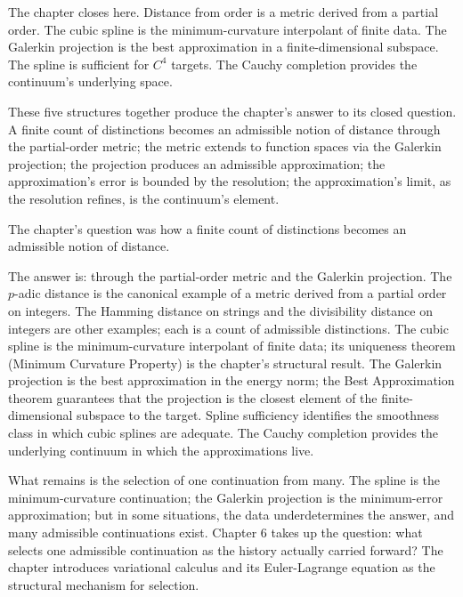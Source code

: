 The chapter closes here. Distance from order is a metric derived
from a partial order. The cubic spline is the minimum-curvature
interpolant of finite data. The Galerkin projection is the best
approximation in a finite-dimensional subspace. The spline is
sufficient for $C^4$ targets. The Cauchy completion provides the
continuum's underlying space.

These five structures together produce the chapter's answer to its
closed question. A finite count of distinctions becomes an
admissible notion of distance through the partial-order metric;
the metric extends to function spaces via the Galerkin projection;
the projection produces an admissible approximation; the
approximation's error is bounded by the resolution; the
approximation's limit, as the resolution refines, is the
continuum's element.

\begin{bridge}

The chapter's question was how a finite count of distinctions
becomes an admissible notion of distance.

The answer is: through the partial-order metric and the Galerkin
projection. The $p$-adic distance is the canonical example of a
metric derived from a partial order on integers. The Hamming
distance on strings and the divisibility distance on integers are
other examples; each is a count of admissible distinctions. The
cubic spline is the minimum-curvature interpolant of finite data;
its uniqueness theorem (Minimum Curvature Property) is the
chapter's structural result. The Galerkin projection is the best
approximation in the energy norm; the Best Approximation theorem
guarantees that the projection is the closest element of the
finite-dimensional subspace to the target. Spline sufficiency
identifies the smoothness class in which cubic splines are
adequate. The Cauchy completion provides the underlying continuum
in which the approximations live.

What remains is the selection of one continuation from many. The
spline is the minimum-curvature continuation; the Galerkin
projection is the minimum-error approximation; but in some
situations, the data underdetermines the answer, and many
admissible continuations exist. Chapter 6 takes up the question:
what selects one admissible continuation as the history actually
carried forward? The chapter introduces variational calculus and
its Euler-Lagrange equation as the structural mechanism for
selection.

\end{bridge}

